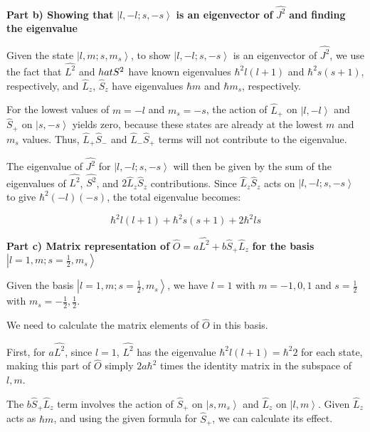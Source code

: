 \textbf{Part b) Showing that} \( \left|l, -l; s, -s \right> \) \textbf{is an eigenvector of} \( \hat{J^{2}} \) \textbf{and finding the eigenvalue}

Given the state \( \left|l, m; s, m_{s} \right> \), to show \( \left|l, -l; s, -s \right> \) is an eigenvector of \( \hat{J^{2}} \), we use the fact that \( \hat{L^{2}} \) and \( \\hat{S^{2}} \) have known eigenvalues \( \hbar^2 l(l+1) \) and \( \hbar^2 s(s+1) \), respectively, and \( \hat{L}_{z} \), \( \hat{S}_{z} \) have eigenvalues \( \hbar m \) and \( \hbar m_{s} \), respectively.

For the lowest values of \( m = -l \) and \( m_{s} = -s \), the action of \( \hat{L}_{+} \) on \( \left|l, -l \right> \) and \( \hat{S}_{+} \) on \( \left|s, -s \right> \) yields zero, because these states are already at the lowest \( m \) and \( m_{s} \) values. Thus, \( \hat{L}_{+}\hat{S}_{-} \) and \( \hat{L}_{-}\hat{S}_{+} \) terms will not contribute to the eigenvalue.

The eigenvalue of \( \hat{J^{2}} \) for \( \left|l, -l; s, -s \right> \) will then be given by the sum of the eigenvalues of \( \hat{L^{2}} \), \( \hat{S^{2}} \), and \( 2\hat{L}_{z}\hat{S}_{z} \) contributions. Since \( \hat{L}_{z}\hat{S}_{z} \) acts on \( \left|l, -l; s, -s \right> \) to give \( \hbar^2 (-l)(-s) \), the total eigenvalue becomes:

\[ \hbar^2 l(l+1) + \hbar^2 s(s+1) + 2\hbar^2 ls \]

\textbf{Part c) Matrix representation of} \( \hat{O} = a\hat{L^{2}} + b\hat{S}_{+}\hat{L}_{z} \) \textbf{for the basis} \( \left|l=1, m; s=\frac{1}{2}, m_{s} \right> \)

Given the basis \( \left|l=1, m; s=\frac{1}{2}, m_{s} \right> \), we have \( l=1 \) with \( m = -1, 0, 1 \) and \( s=\frac{1}{2} \) with \( m_{s} = -\frac{1}{2}, \frac{1}{2} \).

We need to calculate the matrix elements of \( \hat{O} \) in this basis.

First, for \( a\hat{L^{2}} \), since \( l=1 \), \( \hat{L^{2}} \) has the eigenvalue \( \hbar^2 l(l+1) = \hbar^2 2 \) for each state, making this part of \( \hat{O} \) simply \( 2a\hbar^2 \) times the identity matrix in the subspace of \( l, m \).

The \( b\hat{S}_{+}\hat{L}_{z} \) term involves the action of \( \hat{S}_{+} \) on \( \left|s, m_{s} \right> \) and \( \hat{L}_{z} \) on \( \left|l, m \right> \). Given \( \hat{L}_{z} \) acts as \( \hbar m \), and using the given formula for \( \hat{S}_{+} \), we can calculate its effect.

